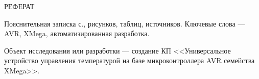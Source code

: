 \begin{center}\MakeUppercase{Реферат}\end{center}

Пояснительная записка  с.,  рисунков,  таблиц,  источников.
Ключевые слова --- AVR, XMega, автоматизированная разработка.


Объект исследования или разработки --- создание КП <<Универсальное устройство управления
температурой на базе микроконтроллера AVR семейства XMega>>.

\newpage{}









